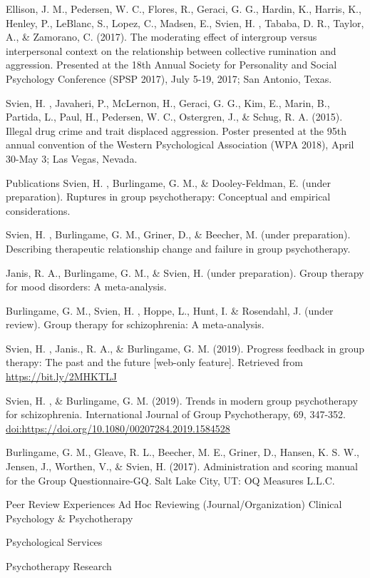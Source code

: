 \documentclass[
]{article}
\begin{document}
Ellison, J. M., Pedersen, W. C., Flores, R., Geraci, G. G., Hardin, K., Harris, K., Henley, P., LeBlanc, S., Lopez, C., Madsen, E., Svien, H. , Tababa, D. R., Taylor, A., \& Zamorano, C. (2017). The moderating effect of intergroup versus interpersonal context on the relationship between collective rumination and aggression. Presented at the 18th Annual Society for Personality and Social Psychology Conference (SPSP 2017), July 5-19, 2017; San Antonio, Texas.

Svien, H. , Javaheri, P., McLernon, H., Geraci, G. G., Kim, E., Marin, B., Partida, L., Paul, H., Pedersen, W. C., Ostergren, J., \& Schug, R. A. (2015). Illegal drug crime and trait displaced aggression. Poster presented at the 95th annual convention of the Western Psychological Association (WPA 2018), April 30-May 3; Las Vegas, Nevada.

Publications
Svien, H. , Burlingame, G. M., \& Dooley-Feldman, E. (under preparation). Ruptures in group psychotherapy: Conceptual and empirical considerations.

Svien, H. , Burlingame, G. M., Griner, D., \& Beecher, M. (under preparation). Describing therapeutic relationship change and failure in group psychotherapy.

Janis, R. A., Burlingame, G. M., \& Svien, H. (under preparation). Group therapy for mood disorders: A meta-analysis.

Burlingame, G. M., Svien, H. , Hoppe, L., Hunt, I. \& Rosendahl, J. (under review). Group therapy for schizophrenia: A meta-analysis.

Svien, H. , Janis., R. A., \& Burlingame, G. M. (2019). Progress feedback in group therapy: The past and the future {[}web-only feature{]}. Retrieved from \url{https://bit.ly/2MHKTLJ}

Svien, H. , \& Burlingame, G. M. (2019). Trends in modern group psychotherapy for schizophrenia. International Journal of Group Psychotherapy, 69, 347-352. \url{doi:https://doi.org/10.1080/00207284.2019.1584528}

Burlingame, G. M., Gleave, R. L., Beecher, M. E., Griner, D., Hansen, K. S. W., Jensen, J., Worthen, V., \& Svien, H. (2017). Administration and scoring manual for the Group Questionnaire-GQ. Salt Lake City, UT: OQ Measures L.L.C.

Peer Review Experiences
Ad Hoc Reviewing (Journal/Organization)
Clinical Psychology \& Psychotherapy

Psychological Services

Psychotherapy Research
\end{document}

